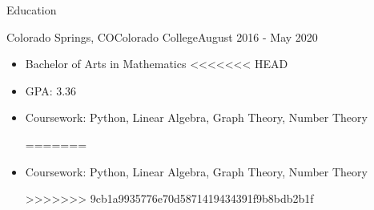 
\begin{cvsection}{Education}
	\begin{cvsubsection}{Colorado Springs, CO}{Colorado College}{August 2016 - May 2020}
		\begin{itemize}
			\item Bachelor of Arts in Mathematics
<<<<<<< HEAD
			\item GPA: 3.36
			\item Coursework: Python, Linear Algebra, Graph Theory, Number Theory
			
			
=======

			\item Coursework: Python, Linear Algebra, Graph Theory, Number Theory
			
>>>>>>> 9cb1a9935776e70d5871419434391f9b8bdb2b1f
		\end{itemize}
	\end{cvsubsection}
\end{cvsection}
